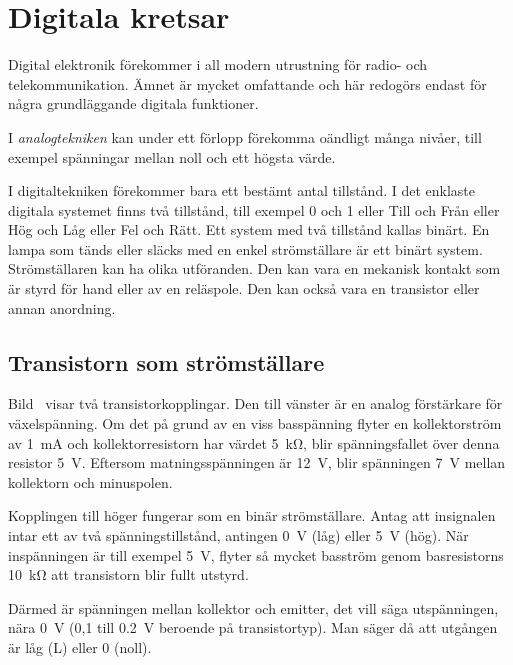 \newpage
\section{Digitala kretsar}
\label{digitala kretsar}

Digital elektronik förekommer i all modern utrustning för radio- och
telekommunikation.
Ämnet är mycket omfattande och här redogörs endast för några grundläggande
digitala funktioner.

I \emph{analogtekniken} kan under ett förlopp förekomma oändligt många nivåer,
till exempel spänningar mellan noll och ett högsta värde.

I digitaltekniken förekommer bara ett bestämt antal tillstånd.
I det enklaste digitala systemet finns två tillstånd, till exempel 0 och 1 eller
Till och Från eller Hög och Låg eller Fel och Rätt.
Ett system med två tillstånd kallas binärt.
En lampa som tänds eller släcks med en enkel strömställare är ett binärt system.
Strömställaren kan ha olika utföranden.
Den kan vara en mekanisk kontakt som är styrd för hand eller av en reläspole.
Den kan också vara en transistor eller annan anordning.

\subsection{Transistorn som strömställare}
\label{transistor_strömställare}


Bild~ visar två transistorkopplingar.
Den till vänster är en analog förstärkare för växelspänning.
Om det på grund av en viss basspänning flyter en kollektorström av
\qty{1}{\milli\ampere} och kollektorresistorn har värdet \qty{5}{\kilo\ohm},
blir spänningsfallet över denna resistor \qty{5}{\volt}.
Eftersom matningsspänningen är \qty{12}{\volt}, blir spänningen \qty{7}{\volt}
mellan kollektorn och minuspolen.

Kopplingen till höger fungerar som en binär strömställare.
Antag att insignalen intar ett av två spänningstillstånd, antingen
\qty{0}{\volt} (låg) eller \qty{5}{\volt} (hög).
När inspänningen är till exempel \qty{5}{\volt}, flyter så mycket basström genom
basresistorns \qty{10}{\kilo\ohm} att transistorn blir fullt utstyrd.

Därmed är spänningen mellan kollektor och emitter, det vill säga utspänningen,
nära \qty{0}{\volt} (0,1 till \qty{0,2}{\volt} beroende på transistortyp).
Man säger då att utgången är låg (L) eller 0 (noll).

